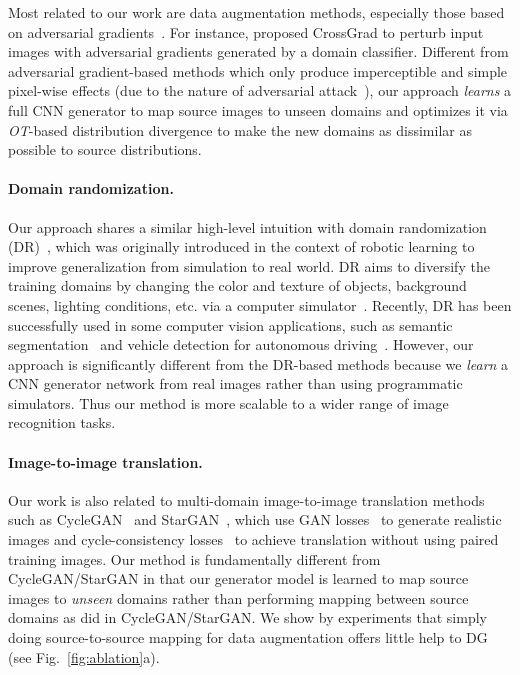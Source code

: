 \documentclass[runningheads]{llncs}
\begin{document}
Most related to our work are data augmentation methods, especially those based on adversarial gradients~\cite{shankar2018generalizing,volpi2018generalizing}. For instance, \cite{shankar2018generalizing} proposed CrossGrad to perturb input images with adversarial gradients generated by a domain classifier. Different from adversarial gradient-based methods which only produce imperceptible and simple pixel-wise effects (due to the nature of adversarial attack~\cite{szegedy2014intriguing}), our approach \emph{learns} a full CNN generator to map source images to unseen domains and optimizes it via \emph{OT}-based distribution divergence to make the new domains as dissimilar as possible to source distributions.

\paragraph{Domain randomization.}
Our approach shares a similar high-level intuition with domain randomization (DR)~\cite{DomainRandomization}, which was originally introduced in the context of robotic learning to improve generalization from simulation to real world. DR aims to diversify the training domains by changing the color and texture of objects, background scenes, lighting conditions, etc. via a computer simulator~\cite{DomainRandomization}. Recently, DR has been successfully used in some computer vision applications, such as semantic segmentation~\cite{yue2019domain,zakharov2019deceptionnet} and vehicle detection for autonomous driving~\cite{prakash2019structured}. However, our approach is significantly different from the DR-based methods because we \emph{learn} a CNN generator network from real images rather than using programmatic simulators. Thus our method is more scalable to a wider range of image recognition tasks.

\paragraph{Image-to-image translation.}
Our work is also related to multi-domain image-to-image translation methods such as CycleGAN~\cite{CycleGAN} and StarGAN~\cite{StarGAN}, which use GAN losses~\cite{goodfellow2014generative} to generate realistic images and cycle-consistency losses~\cite{CycleGAN} to achieve translation without using paired training images. Our method is fundamentally different from CycleGAN/StarGAN in that our generator model is learned to map source images to \emph{unseen} domains rather than performing mapping between source domains as did in CycleGAN/StarGAN. We show by experiments that simply doing source-to-source mapping for data augmentation offers little help to DG (see Fig.~\ref{fig:ablation}a).
\end{document}
